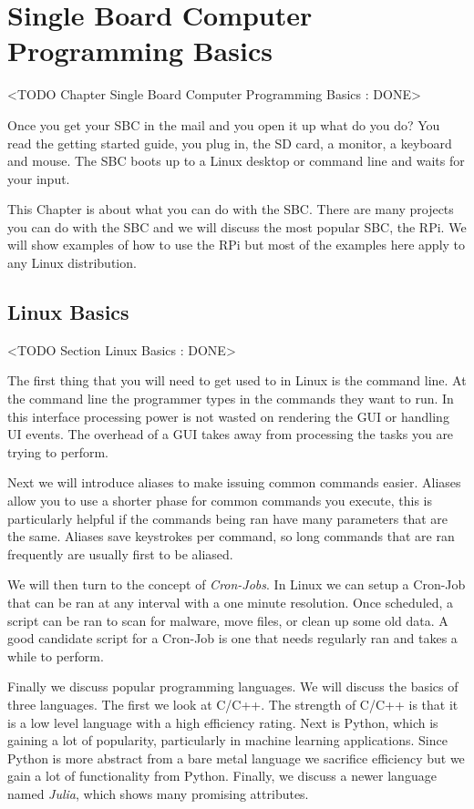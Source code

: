 \chapter{Single Board Computer Programming Basics}
	<TODO Chapter Single Board Computer Programming Basics : DONE>

Once you get your \ac{SBC} in the mail and you open it up what do you do? You read the getting started guide, you plug in, the \ac{SD} card, a monitor, a keyboard and mouse. The \ac{SBC} boots up to a Linux desktop or command line and waits for your input. 

This Chapter is about what you can do with the \ac{SBC}. There are many projects you can do with the \ac{SBC} and we will discuss the most popular \ac{SBC}, the \ac{RPi}. We will show examples of how to use the \ac{RPi} but most of the examples here apply to any Linux distribution. 

\section{Linux Basics}
	<TODO Section Linux Basics : DONE>

The first thing that you will need to get used to in Linux is the command line. At the command line the programmer types in the commands they want to run. In this interface processing power is not wasted on rendering the \ac{GUI} or handling \ac{UI} events. The overhead of a \ac{GUI} takes away from processing the tasks you are trying to perform. 

Next we will introduce aliases to make issuing common commands easier. Aliases allow you to use a shorter phase for common commands you execute, this is particularly helpful if the commands being ran have many parameters that are the same. Aliases save keystrokes per command, so long commands that are ran frequently are usually first to be aliased. 

We will then turn to the concept of \emph{Cron-Jobs}. In Linux we can setup a Cron-Job that can be ran at any interval with a one minute resolution. Once scheduled, a script can be ran to scan for malware, move files, or clean up some old data. A good candidate script for a Cron-Job is one that needs regularly ran and takes a while to perform. 

Finally we discuss popular programming languages. We will discuss the basics of three languages. The first we look at C/C++. The strength of C/C++ is that it is a low level language with a high efficiency rating. Next is Python, which is gaining a lot of popularity, particularly in machine learning applications. Since Python is more abstract from a bare metal language we sacrifice efficiency but we gain a lot of functionality from Python. Finally, we discuss a newer language named \emph{Julia}, which shows many promising attributes.  
	
